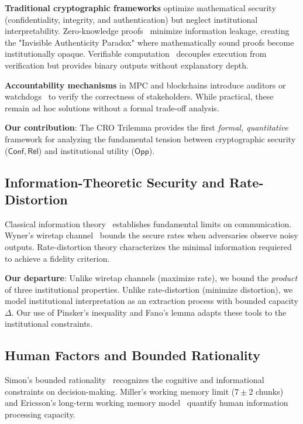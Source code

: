 \documentclass{ieeeaccess}
\newcommand{\Conf}{\mathsf{Conf}}
\newcommand{\Rel}{\mathsf{Rel}}
\newcommand{\Opp}{\mathsf{Opp}}
\begin{document}
\textbf{Traditional cryptographic frameworks} optimize mathematical security (confidentiality, integrity, and authentication) but neglect institutional interpretability. Zero-knowledge proofs~\cite{GMR85,Groth16} minimize information leakage, creating the "Invisible Authenticity Paradox" where mathematically sound proofs become institutionally opaque. Verifiable computation~\cite{Gennaro13} decouples execution from verification but provides binary outputs without explanatory depth. 

\textbf{Accountability mechanisms} in MPC and blockchains introduce auditors or watchdogs~\cite{Asharov12,Garay15} to verify the correctness of stakeholders. While practical, these remain ad hoc solutions without a formal trade-off analysis.

\textbf{Our contribution}: The CRO Trilemma provides the first \emph{formal, quantitative} framework for analyzing the fundamental tension between cryptographic security ($\Conf,\Rel$) and institutional utility ($\Opp$).

\subsection{Information-Theoretic Security and Rate-Distortion}

Classical information theory~\cite{Shannon48,CoverThomas06} establishes fundamental limits on communication. Wyner's wiretap channel~\cite{Wyner75} bounds the secure rates when adversaries observe noisy outputs. Rate-distortion theory characterizes the minimal information requiered to achieve a fidelity criterion.

\textbf{Our departure}: Unlike wiretap channels (maximize rate), we bound the \emph{product} of three institutional properties. Unlike rate-distortion (minimize distortion), we model institutional interpretation as an extraction process with bounded capacity $\Delta$. Our use of Pinsker's inequality and Fano's lemma adapts these tools to the institutional constraints.

\subsection{Human Factors and Bounded Rationality}

Simon's bounded rationality~\cite{Simon82} recognizes the cognitive and informational constraints on decision-making. Miller's working memory limit ($7\pm2$ chunks)~\cite{Miller56} and Ericsson's long-term working memory model~\cite{Ericsson95} quantify human information processing capacity.
\end{document}
